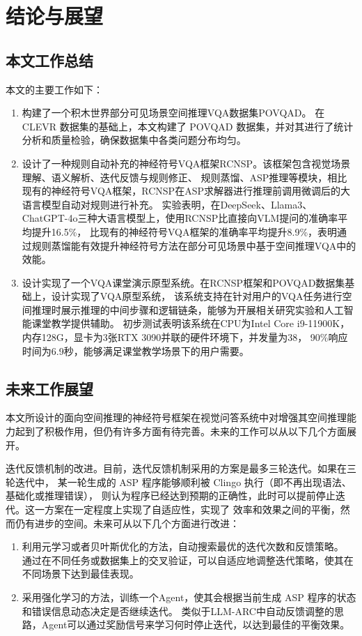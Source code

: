 \chapter{结论与展望}
\section{本文工作总结}
本文的主要工作如下：
\begin{enumerate}[itemsep=0pt,parsep=0pt]
\item 构建了一个积木世界部分可见场景空间推理VQA数据集POVQAD。
在 CLEVR 数据集的基础上，本文构建了 POVQAD 数据集，并对其进行了统计分析和质量检验，确保数据集中各类问题分布均匀。
\item 设计了一种规则自动补充的神经符号VQA框架RCNSP。该框架包含视觉场景理解、语义解析、迭代反馈与规则修正、
规则蒸馏、ASP推理等模块，相比现有的神经符号VQA框架，RCNSP在ASP求解器进行推理前调用微调后的大语言模型自动对规则进行补充。
实验表明，在DeepSeek、Llama3、ChatGPT-4o三种大语言模型上，使用RCNSP比直接向VLM提问的准确率平均提升16.5\%，
比现有的神经符号VQA框架的准确率平均提升8.9\%，表明通过规则蒸馏能有效提升神经符号方法在部分可见场景中基于空间推理VQA中的效能。
\item 设计实现了一个VQA课堂演示原型系统。在RCNSP框架和POVQAD数据集基础上，设计实现了VQA原型系统，
该系统支持在针对用户的VQA任务进行空间推理时展示推理的中间步骤和逻辑链条，能够为开展相关研究实验和人工智能课堂教学提供辅助。
初步测试表明该系统在CPU为Intel Core i9-11900K，内存128G，显卡为3张RTX 3090并联的硬件环境下，并发量为38，
90\%响应时间为6.9秒，能够满足课堂教学场景下的用户需要。
\end{enumerate}
\section{未来工作展望}
本文所设计的面向空间推理的神经符号框架在视觉问答系统中对增强其空间推理能力起到了积极作用，但仍有许多方面有待完善。未来的工作可以从以下几个方面展开。

迭代反馈机制的改进。目前，迭代反馈机制采用的方案是最多三轮迭代。如果在三轮迭代中，
某一轮生成的 ASP 程序能够顺利被 Clingo 执行（即不再出现语法、基础化或推理错误），
则认为程序已经达到预期的正确性，此时可以提前停止迭代。这一方案在一定程度上实现了自适应性，实现了
效率和效果之间的平衡，然而仍有进步的空间。未来可从以下几个方面进行改进：
\begin{enumerate}[itemsep=0pt,parsep=0pt]
    \item 利用元学习或者贝叶斯优化的方法，自动搜索最优的迭代次数和反馈策略。
通过在不同任务或数据集上的交叉验证，可以自适应地调整迭代策略，使其在不同场景下达到最佳表现。
    \item 采用强化学习的方法，训练一个Agent，使其会根据当前生成 ASP 程序的状态和错误信息动态决定是否继续迭代。
类似于LLM-ARC中自动反馈调整的思路，Agent可以通过奖励信号来学习何时停止迭代，以达到最佳的平衡效果\cite{kalyanpur2024llmarcenhancingllmsautomated}。
\end{enumerate}

